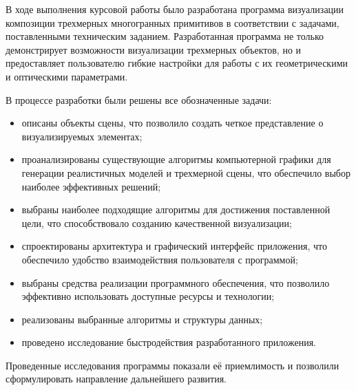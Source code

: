 
В ходе выполнения курсовой работы было разработана программа визуализации композиции трехмерных многогранных примитивов в соответствии с задачами, поставленными техническим заданием. Разработанная программа не только демонстрирует возможности визуализации трехмерных объектов, но и предоставляет пользователю гибкие настройки для работы с их геометрическими и оптическими параметрами.

В процессе разработки были решены все обозначенные задачи:
\begin{itemize}[label=--]
	\item описаны объекты сцены, что позволило создать четкое представление о визуализируемых элементах;
	\item проанализированы существующие алгоритмы компьютерной графики для генерации реалистичных моделей и трехмерной сцены, что обеспечило выбор наиболее эффективных решений;
	\item выбраны наиболее подходящие алгоритмы для достижения поставленной цели, что способствовало созданию качественной визуализации;
	\item спроектированы архитектура и графический интерфейс приложения, что обеспечило удобство взаимодействия пользователя с программой;
	\item выбраны средства реализации программного обеспечения, что позволило эффективно использовать доступные ресурсы и технологии;
	\item реализованы выбранные алгоритмы и структуры данных;
	\item проведено исследование быстродействия разработанного приложения.
\end{itemize}

Проведенные исследования программы показали её приемлимость и позволили сформулировать направление дальнейшего развития.